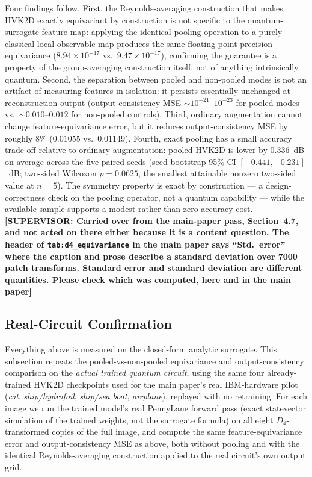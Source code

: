 \documentclass[11pt]{article}
\begin{document}
Four findings follow. First, the Reynolds-averaging construction that makes HVK2D exactly equivariant by construction is not specific to the quantum-surrogate feature map: applying the identical pooling operation to a purely classical local-observable map produces the same floating-point-precision equivariance ($8.94\times10^{-17}$ vs.\ $9.47\times10^{-17}$), confirming the guarantee is a property of the group-averaging construction itself, not of anything intrinsically quantum. Second, the separation between pooled and non-pooled modes is not an artifact of measuring features in isolation: it persists essentially unchanged at reconstruction output (output-consistency MSE $\sim10^{-21}$--$10^{-23}$ for pooled modes vs.\ $\sim0.010$--$0.012$ for non-pooled controls). Third, ordinary augmentation cannot change feature-equivariance error, but it reduces output-consistency MSE by roughly $8\%$ ($0.01055$ vs.\ $0.01149$). Fourth, exact pooling has a small accuracy trade-off relative to ordinary augmentation: pooled HVK2D is lower by $0.336$~dB on average across the five paired seeds (seed-bootstrap 95\% CI $[-0.441,-0.231]$~dB; two-sided Wilcoxon $p=0.0625$, the smallest attainable nonzero two-sided value at $n=5$). The symmetry property is exact by construction --- a design-correctness check on the pooling operator, not a quantum capability --- while the available sample supports a modest rather than zero accuracy cost. {\color{red}\textbf{[SUPERVISOR: Carried over from the main-paper pass, Section~4.7, and not acted on there either because it is a content question. The header of \texttt{tab:d4\_equivariance} in the main paper says ``Std.\ error'' where the caption and prose describe a standard deviation over 7000 patch transforms. Standard error and standard deviation are different quantities. Please check which was computed, here and in the main paper]}}

\subsection{Real-Circuit Confirmation}
\label{sec:d4_real_circuit}
Everything above is measured on the closed-form analytic surrogate. This subsection repeats the pooled-vs-non-pooled equivariance and output-consistency comparison on the \emph{actual trained quantum circuit}, using the same four already-trained HVK2D checkpoints used for the main paper's real IBM-hardware pilot (\textit{cat}, \textit{ship/hydrofoil}, \textit{ship/sea boat}, \textit{airplane}), replayed with no retraining. For each image we run the trained model's real PennyLane forward pass (exact statevector simulation of the trained weights, not the surrogate formula) on all eight $D_4$-transformed copies of the full image, and compute the same feature-equivariance error and output-consistency MSE as above, both without pooling and with the identical Reynolds-averaging construction applied to the real circuit's own output grid.
\end{document}
